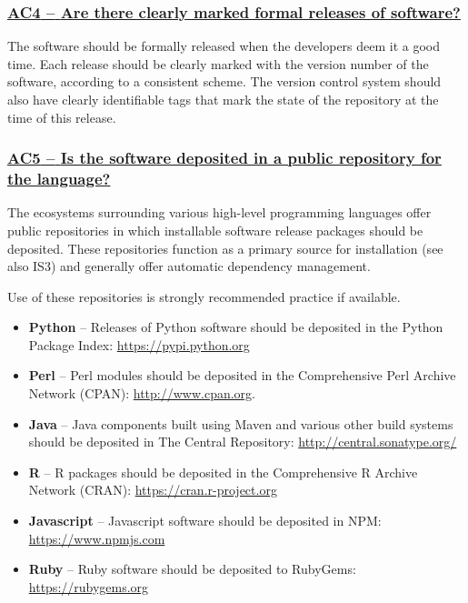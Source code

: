 \documentclass[a4paper,11pt]{article}
\newcommand{\indicator}[1]{\subsubsection*{\underline{#1}}}
\begin{document}
\newcommand{\acFourName}{AC4}
\newcommand{\acFourID}{\acFourName}
\newcommand{\acFourText}{Are there clearly marked formal releases of software?}
\indicator{\acFourName{ }--{ }\acFourText}\label{id:ac4} 

The software should be formally released when the developers deem it a good
time. Each release should be clearly marked with the version number of the
software, according to a consistent scheme. The version control system should
also have clearly identifiable tags that mark the state of the repository at
the time of this release.

\newcommand{\acFiveName}{AC5}
\newcommand{\acFiveID}{\acFiveName}
\newcommand{\acFiveText}{Is the software deposited in a public repository for the language?}
\indicator{\acFiveName{ }--{ }\acFiveText}\label{id:ac5} 

The ecosystems surrounding various high-level programming languages offer
public repositories in which installable software release packages should be
deposited. These repositories function as a primary source for installation (see also
IS3) and generally offer automatic dependency management.

Use of these repositories is strongly recommended practice if available.

\begin{itemize}
    \item \textbf{Python} -- Releases of Python software should be deposited in
        the Python Package Index: \url{https://pypi.python.org}
    \item \textbf{Perl} --  Perl modules should be deposited in the Comprehensive
        Perl Archive Network (CPAN): \url{http://www.cpan.org}.
    \item \textbf{Java} -- Java components built using Maven and various other
        build systems should be deposited in The Central Repository: \url{http://central.sonatype.org/}
    \item \textbf{R} -- R packages should be deposited in the Comprehensive R
        Archive Network (CRAN): \url{https://cran.r-project.org}
    \item \textbf{Javascript} -- Javascript software should be deposited in
        NPM: \url{https://www.npmjs.com}
    \item \textbf{Ruby} -- Ruby software should be deposited to 
        RubyGems: \url{https://rubygems.org}
\end{itemize}
\end{document}
